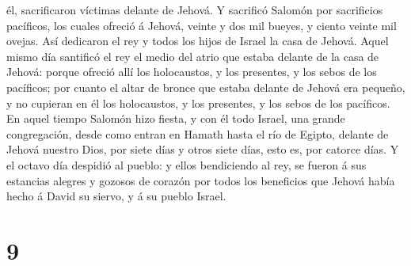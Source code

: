 él, sacrificaron víctimas delante de Jehová.  Y sacrificó
Salomón por sacrificios pacíficos, los cuales ofreció á Jehová, veinte y
dos mil bueyes, y ciento veinte mil ovejas. Así dedicaron el rey y todos
los hijos de Israel la casa de Jehová.  Aquel mismo día
santificó el rey el medio del atrio que estaba delante de la casa de
Jehová: porque ofreció allí los holocaustos, y los presentes, y los
sebos de los pacíficos; por cuanto el altar de bronce que estaba delante
de Jehová era pequeño, y no cupieran en él los holocaustos, y los
presentes, y los sebos de los pacíficos.  En aquel tiempo
Salomón hizo fiesta, y con él todo Israel, una grande congregación,
desde como entran en Hamath hasta el río de Egipto, delante de Jehová
nuestro Dios, por siete días y otros siete días, esto es, por catorce
días.  Y el octavo día despidió al pueblo: y ellos
bendiciendo al rey, se fueron á sus estancias alegres y gozosos de
corazón por todos los beneficios que Jehová había hecho á David su
siervo, y á su pueblo Israel.

\hypertarget{section-8}{%
\section{9}\label{section-8}}

